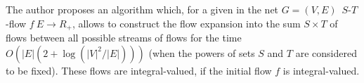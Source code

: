 \beginreview
The author proposes an algorithm which, for a given in the net $G=(V,E)$ $\,S$-$T$-flow $f\: E\to R_+$, allows to construct the flow expansion into the sum $S\times T$ of flows between all possible streams of flows for the time $O(\vert E\vert (2+\log(\vert V\vert ^2/\vert E\vert )))$ (when the powers of sets $S$ and $T$ are considered to be fixed). These flows are integral-valued, if the initial flow $f$ is integral-valued.
\endreview{}
